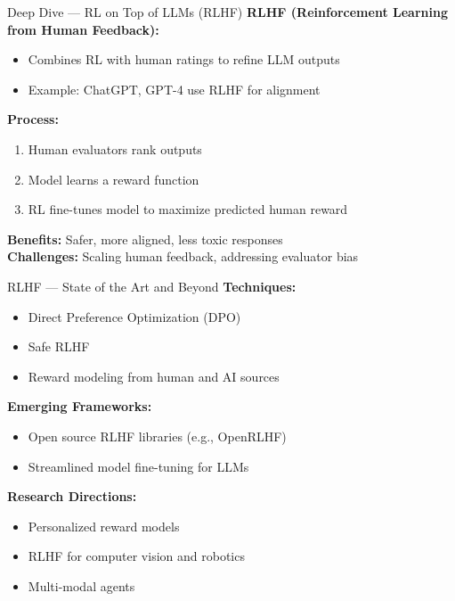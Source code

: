 \documentclass[aspectratio=169]{beamer}
\begin{document}
\begin{frame}{Deep Dive — RL on Top of LLMs (RLHF)}
  \textbf{RLHF (Reinforcement Learning from Human Feedback):}
  \begin{itemize}
    \item Combines RL with human ratings to refine LLM outputs
    \item Example: ChatGPT, GPT-4 use RLHF for alignment
  \end{itemize}

  \vspace{0.3cm}
  \textbf{Process:}
  \begin{enumerate}
    \item Human evaluators rank outputs
    \item Model learns a reward function
    \item RL fine-tunes model to maximize predicted human reward
  \end{enumerate}

  \vspace{0.3cm}
  \textbf{Benefits:} Safer, more aligned, less toxic responses\\
  \textbf{Challenges:} Scaling human feedback, addressing evaluator bias
\end{frame}

\begin{frame}{RLHF — State of the Art and Beyond}
  \textbf{Techniques:}
  \begin{itemize}
    \item Direct Preference Optimization (DPO)
    \item Safe RLHF
    \item Reward modeling from human and AI sources
  \end{itemize}

  \vspace{0.3cm}
  \textbf{Emerging Frameworks:}
  \begin{itemize}
    \item Open source RLHF libraries (e.g., OpenRLHF)
    \item Streamlined model fine-tuning for LLMs
  \end{itemize}

  \vspace{0.3cm}
  \textbf{Research Directions:}
  \begin{itemize}
    \item Personalized reward models
    \item RLHF for computer vision and robotics
    \item Multi-modal agents
  \end{itemize}
\end{frame}
\end{document}

